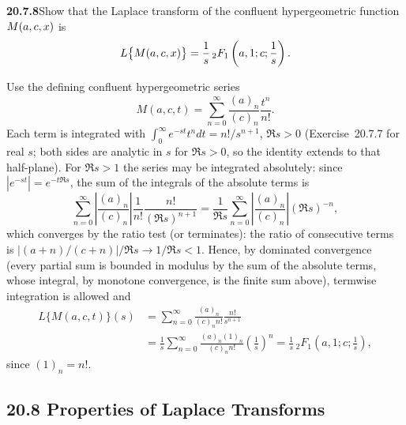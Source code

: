 \par\bigskip
\noindent\textbf{20.7.8}\quad Show that the Laplace transform of
the confluent hypergeometric function $M(a, c\erratum{,}\, x)$ is
\[
L\big\{M(a, c\erratum{,}\, x)\big\}
=\frac{1}{s}\,{}_{2}F_{1}\left(a, 1; c; \frac{1}{s}\right).
\]
\par{}
\solution
Use the defining confluent hypergeometric series
\[
M(a,c,t)=\sum_{n=0}^\infty\frac{(a)_n}{(c)_n}\frac{t^n}{n!}.
\]
Each term is integrated with
$\int_0^\infty e^{-st}t^ndt=n!/s^{n+1}$, $\Re s>0$ (Exercise~20.7.7
for real $s$; both sides are analytic in $s$ for $\Re s>0$, so
the identity extends to that half-plane).
For $\Re s>1$ the series may be integrated absolutely:
since $|e^{-st}|=e^{-t\Re s}$, the sum of the integrals of the
absolute terms is
\[
\sum_{n=0}^\infty\left|\frac{(a)_n}{(c)_n}\right|
\frac1{n!}\frac{n!}{(\Re s)^{n+1}}
=\frac1{\Re s}\sum_{n=0}^\infty
\left|\frac{(a)_n}{(c)_n}\right|(\Re s)^{-n},
\]
which converges by the ratio test (or terminates): the ratio
of consecutive terms is $|(a+n)/(c+n)|/\Re s\to1/\Re s<1$.
Hence, by dominated convergence (every partial sum is bounded in
modulus by the sum of the absolute terms, whose integral, by
monotone convergence, is the finite sum above), termwise
integration is allowed and
\begin{align*}
L\{M(a,c,t)\}(s)
&=\sum_{n=0}^\infty\frac{(a)_n}{(c)_n n!}
\frac{n!}{s^{n+1}}\\
&=\frac1s\sum_{n=0}^\infty
\frac{(a)_n(1)_n}{(c)_n n!}\left(\frac1s\right)^n
=\boxed{\frac1s\,{}_2F_1\left(a,1;c;\frac1s\right)},
\end{align*}
since $(1)_n=n!$.

\subsection*{20.8 Properties of Laplace Transforms}

